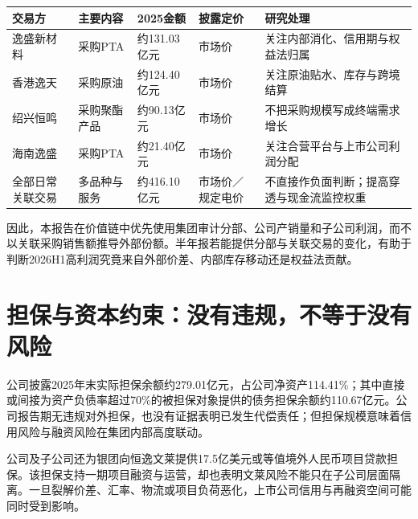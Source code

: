 \begin{exhibitbox}[高影响关联交易与研究处理]
\small
\noindent\begin{tabularx}{\textwidth}{L{2.7cm}L{2.25cm}R{2.0cm}L{2.2cm}X}
\toprule
\textbf{交易方} & \textbf{主要内容} & \textbf{2025金额} & \textbf{披露定价} & \textbf{研究处理} \\
\midrule
逸盛新材料 & 采购PTA & 约131.03亿元 & 市场价 & 关注内部消化、信用期与权益法归属 \\
香港逸天 & 采购原油 & 约124.40亿元 & 市场价 & 关注原油贴水、库存与跨境结算 \\
绍兴恒鸣 & 采购聚酯产品 & 约90.13亿元 & 市场价 & 不把采购规模写成终端需求增长 \\
海南逸盛 & 采购PTA & 约21.40亿元 & 市场价 & 关注合营平台与上市公司利润分配 \\
全部日常关联交易 & 多品种与服务 & 约416.10亿元 & 市场价／规定电价 & 不直接作负面判断；提高穿透与现金流监控权重 \\
\bottomrule
\end{tabularx}
\end{exhibitbox}

因此，本报告在价值链中优先使用集团审计分部、公司产销量和子公司利润，而不以关联采购销售额推导外部份额。半年报若能提供分部与关联交易的变化，有助于判断2026H1高利润究竟来自外部价差、内部库存移动还是权益法贡献。

\section{担保与资本约束：没有违规，不等于没有风险}

公司披露2025年末实际担保余额约279.01亿元，占公司净资产114.41\%；其中直接或间接为资产负债率超过70\%的被担保对象提供的债务担保余额约110.67亿元。公司报告期无违规对外担保，也没有证据表明已发生代偿责任；但担保规模意味着信用风险与融资风险在集团内部高度联动。

公司及子公司还为银团向恒逸文莱提供17.5亿美元或等值境外人民币项目贷款担保。该担保支持一期项目融资与运营，却也表明文莱风险不能只在子公司层面隔离。一旦裂解价差、汇率、物流或项目负荷恶化，上市公司信用与再融资空间可能同时受到影响。

